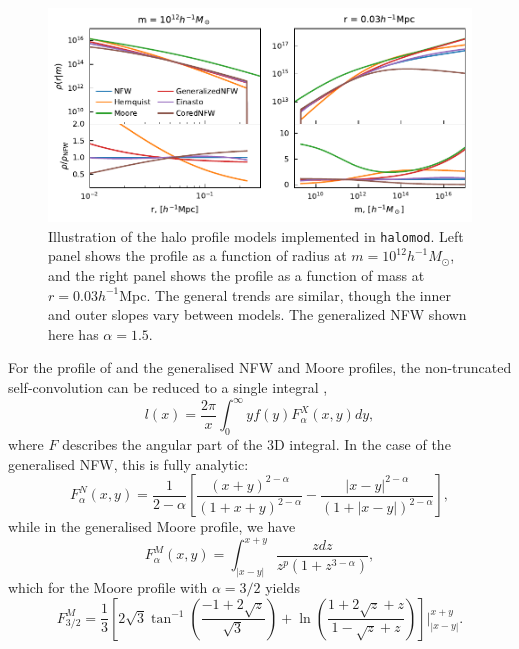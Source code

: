 \documentclass[5p,aas_macros]{elsarticle}
\begin{document}
\begin{figure}
    \centering
    \includegraphics{figures/profile_models.pdf}
    \caption{Illustration of the halo profile models implemented in \texttt{halomod}. Left panel shows the profile as a function of radius at $m=10^{12} h^{-1}M_\odot$, and the right panel shows the profile as a function of mass at $r = 0.03 h^{-1}$Mpc. The general trends are similar, though the inner and outer slopes vary between models. The generalized NFW shown here has $\alpha=1.5$.}
    \label{fig:profiles}
\end{figure}

For the profile of \citet{Moore1998} and the generalised NFW and Moore profiles, the non-truncated self-convolution can be reduced to a single integral \citep{Ma2000},
\begin{equation}
    l(x) = \frac{2\pi}{x}\int_0^\infty yf(y) F^X_\alpha(x,y) dy,
\end{equation}
where $F$ describes the angular part of the 3D integral. In the case of the generalised NFW, this is fully analytic:
\begin{equation}
    F^N_\alpha(x,y) = \frac{1}{2-\alpha}\left[ \frac{(x+y)^{2-\alpha}}{(1+x+y)^{2-\alpha}} - \frac{|x-y|^{2-\alpha}}{(1+|x-y|)^{2-\alpha}}\right],
\end{equation}
while in the generalised Moore profile, we have
\begin{equation}
    F^M_\alpha(x,y) = \int_{|x-y|}^{x+y} \frac{zdz}{z^p(1+z^{3-\alpha})},
\end{equation}
which for the Moore profile with $\alpha=3/2$ yields
\begin{equation}
    F^M_{3/2} = \frac{1}{3}\left[ 2\sqrt{3} \tan^{-1}\left(\frac{-1+2\sqrt{z}}{\sqrt{3}}\right) + \ln\left(\frac{1+2\sqrt{z} + z}{1-\sqrt{z}+z}\right)\right]\Bigg|_{|x-y|}^{x+y}.
\end{equation}
\end{document}
